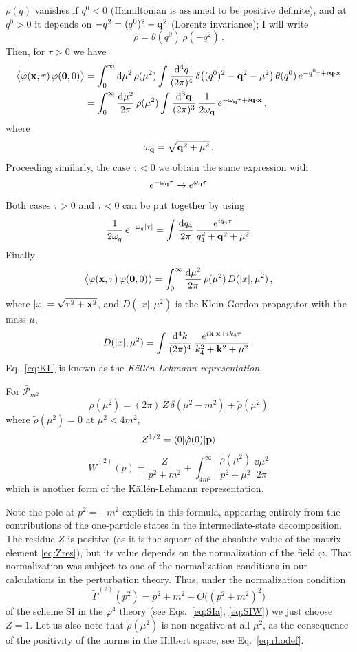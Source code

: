 $\rho(q)$ vanishes if $q^0<0$ (Hamiltonian is assumed to be positive definite), and
at $q^0>0$ it depends on $-q^2=(q^0)^2-\mathbf{q}^2$ (Lorentz invariance); I will write
\[
\rho=\theta(q^0)\,\rho(-q^2)\,.
\]
Then, for $\tau>0$ we have
\begin{align*}
\bigl\langle\varphi(\mathbf{x},\tau)\,\varphi(\mathbf0,0)\bigr\rangle
&=\int_0^\infty \mathop{}\!\mathrm{d}\mu^2\,\rho(\mu^2)\int\frac{\mathop{}\!\mathrm{d}^4q}{(2\pi)^4}\,\delta\bigl((q^0)^2-\mathbf{q}^2-\mu^2\bigr)\,\theta(q^0)\,e^{-q^0\tau+i\mathbf{q}\cdot\mathbf{x}}\\
&=\int_0^\infty\frac{\mathop{}\!\mathrm{d}\mu^2}{2\pi}\,\rho(\mu^2)\int\frac{\mathop{}\!\mathrm{d}^3\mathbf{q}}{(2\pi)^3}\,\frac1{2\omega_{\mathbf{q}}}\,e^{-\omega_{\mathbf{q}}\tau+i\mathbf{q}\cdot\mathbf{x}}\,,
\end{align*}
where
\[
\omega_{\mathbf{q}}=\sqrt{\mathbf{q}^2+\mu^2}\,.
\]
Proceeding similarly, the case $\tau<0$ we obtain the same expression with
\[
e^{-\omega_{\mathbf{q}}\tau}\to e^{\omega_{\mathbf{q}}\tau}
\]
Both cases $\tau>0$ and $\tau<0$ can be put together by using
\[
\frac1{2\omega_q}\,e^{-\omega_q|\tau|}=\int\frac{\mathop{}\!\mathrm{d} q_4}{2\pi}\,\frac{e^{iq_4\tau}}{q_4^2+\mathbf{q}^2+\mu^2}
\]
Finally
\begin{equation}\label{eq:KL}
\bigl\langle\varphi(\mathbf{x},\tau)\,\varphi(\mathbf0,0)\bigr\rangle=\int_0^\infty\frac{\mathop{}\!\mathrm{d}\mu^2}{2\pi}\,\rho(\mu^2)\,D(|x|,\mu^2)\,,
\end{equation}
where $|x|=\sqrt{\tau^2+\mathbf{x}^2}$, and $D(|x|,\mu^2)$ is the Klein-Gordon propagator
with the mass $\mu$,
\[
D(|x|,\mu^2)=\int\frac{\mathop{}\!\mathrm{d}^4k}{(2\pi)^4}\,\frac{e^{i\mathbf{k}\cdot\mathbf{x}+ik_4\tau}}{k_4^2+\mathbf{k}^2+\mu^2}\,.
\]
Eq.~\eqref{eq:KL} is known as the \emph{K\"all\'en-Lehmann representation}.

For $\bar{\mathcal P}_{m^2}$
\[
\rho(\mu^2)=(2\pi)\,Z\,\delta(\mu^2-m^2)+\tilde\rho(\mu^2)
\]
where $\tilde\rho(\mu^2)=0$ at $\mu^2<4m^2$,
\begin{equation}\label{eq:Zres}
Z^{1/2}=\langle 0|\hat\varphi(0)|\mathbf{p}\rangle
\end{equation}
\begin{equation}\label{eq:KLmom}
\tilde W^{(2)}(p)=\frac Z{p^2+m^2}+\int_{4m^2}^\infty\frac{\tilde\rho(\mu^2)}{p^2+\mu^2}\,\frac{\dd\mu^2}{2\pi}
\end{equation}
which is another form of the K\"all\'en-Lehmann representation.

Note the pole at $p^2=-m^2$ explicit in this formula, appearing entirely from the
contributions of the one-particle states in the intermediate-state decomposition.
The residue $Z$ is positive (as it is the square of the absolute value of the matrix
element \eqref{eq:Zres}), but its value depends on the normalization of the field
$\varphi$. That normalization was subject to one of the normalization conditions in
our calculations in the perturbation theory. Thus, under the normalization
condition
\begin{equation}\label{eq:SIrecall}
\tilde\Gamma^{(2)}(p^2)=p^2+m^2+O\bigl((p^2+m^2)^2\bigr)
\end{equation}
of the scheme SI in the $\varphi^4$ theory (see Eqs.~\eqref{eq:SIa},
\eqref{eq:SIW}) we just choose $Z=1$. Let us also note that $\tilde\rho(\mu^2)$ is
non-negative at all $\mu^2$, as the consequence of the positivity of the norms in
the Hilbert space, see Eq.~\eqref{eq:rhodef}.

